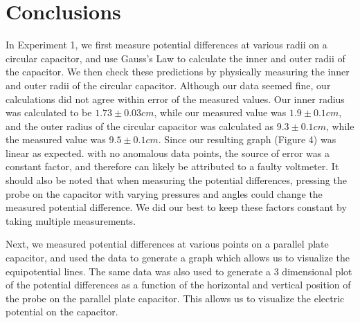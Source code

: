 \documentclass[letterpaper]{article}
\begin{document}
\section{Conclusions}
In Experiment 1, we first measure potential differences at various radii on a circular capacitor,
and use Gauss's Law to calculate the inner and outer radii of the capacitor. We then check these predictions
by physically measuring the inner and outer radii of the circular capacitor. Although our data seemed
fine, our calculations did not agree within error of the measured values. Our inner radius was calculated to be
$1.73 \pm 0.03 cm$, while our measured value was $1.9 \pm 0.1 cm$, and the outer radius of the circular capacitor
was calculated as $9.3 \pm 0.1 cm$, while the measured value was $9.5 \pm 0.1 cm$. Since our resulting graph (Figure 4)
was linear as expected. with no anomalous data points, the source of error was a constant factor, and therefore can
likely be attributed to a faulty voltmeter. It should also be noted that when measuring the potential differences, pressing
the probe on the capacitor with varying pressures and angles could change the measured potential difference.
We did our best to keep these factors constant by taking multiple measurements.

Next, we measured potential differences at various points on a parallel plate capacitor, and used the data to generate
a graph which allows us to visualize the equipotential lines. The same data was also used to generate a 3 dimensional
plot of the potential differences as a function of the horizontal and vertical position of the probe on the parallel plate
capacitor. This allows us to visualize the electric potential on the capacitor.

\end{document}
